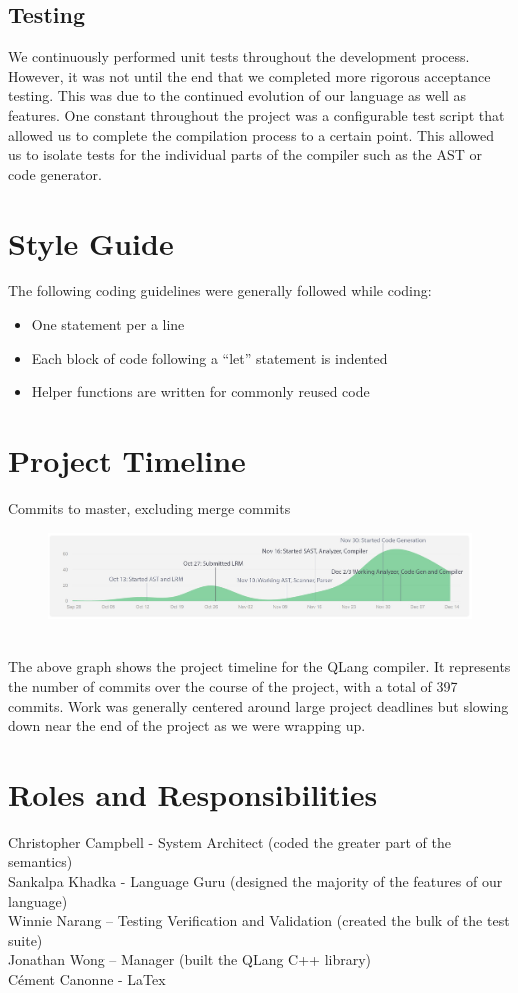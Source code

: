 \subsection{Testing}
We continuously performed unit tests throughout the development process. However, it was not until the end that we completed more rigorous acceptance testing. This was due to the continued evolution of our language as well as features. One constant throughout the project was a configurable test script that allowed us to complete the compilation process to a certain point. This allowed us to isolate tests for the individual parts of the compiler such as the AST or code generator.

\section{Style Guide}
The following coding guidelines were generally followed while coding:

\begin{itemize}
	\item One statement per a line
	\item Each block of code following a “let” statement is indented
	\item Helper functions are written for commonly reused code
\end{itemize}
	
\section{Project Timeline}
Commits to master, excluding merge commits
\begin{figure}[h]
\includegraphics[width=16cm]{teamCommitGraph}
\centering
\end{figure}\\
The above graph shows the project timeline for the QLang compiler. It represents the number of commits over the course of the project, with a total of 397 commits. Work was generally centered around large project deadlines but slowing down near the end of the project as we were wrapping up.

\section{Roles and Responsibilities}
Christopher Campbell  - System Architect (coded the greater part of the semantics)\\
Sankalpa Khadka - Language Guru (designed the majority of the features of our language)\\
Winnie Narang – Testing Verification and Validation (created the bulk of the test suite)\\
Jonathan Wong – Manager (built the QLang C++ library)\\
C\'ement Canonne - LaTex


